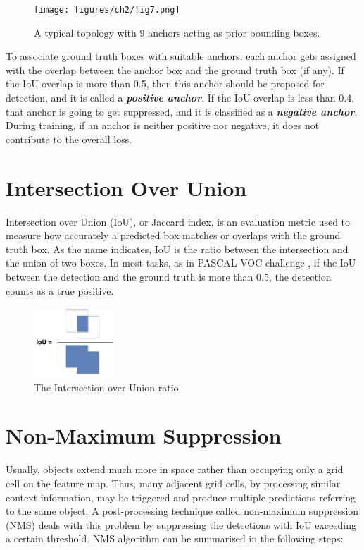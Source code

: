  \begin{figure}[!htb]
  \centering
  \texttt{[image: figures/ch2/fig7.png]}
  \caption{A typical topology with 9 anchors acting as prior bounding boxes.}
  \label{fig7}
\end{figure} 

To associate ground truth boxes with suitable anchors, each anchor gets assigned with the overlap between the anchor box and the ground truth box (if any). If the IoU overlap is more than 0.5, then this anchor should be proposed for detection, and it is called a \textbf{\textit{positive anchor}}. If the IoU overlap is less than 0.4, that anchor is going to get suppressed, and it is classified as a \textbf{\textit{negative anchor}}. During training, if an anchor is neither positive nor negative, it does not contribute to the overall loss.

\section{Intersection Over Union}
Intersection over Union (IoU), or Jaccard index, is an evaluation metric used to measure how accurately a predicted box matches or overlaps with the ground truth box. As the name indicates, IoU is the ratio between the intersection and the union of two boxes. In most tasks, as in PASCAL VOC challenge \cite{everingham2010pascal}, if the IoU between the detection and the ground truth is more than 0.5, the detection counts as a true positive.

\begin{figure}[!htb]
  \centering
  \includegraphics[width=3cm]{figures/ch2/fig8.png}
  \caption{The Intersection over Union ratio.}
  \label{fig8}
\end{figure} 

\section{Non-Maximum Suppression}
Usually, objects extend much more in space rather than occupying only a grid cell on the feature map. Thus, many adjacent grid cells, by processing similar context information, may be triggered and produce multiple predictions referring to the same object. A post-processing technique called non-maximum suppression (NMS) deals with this problem by suppressing the detections with IoU exceeding a certain threshold. NMS algorithm can be summarised in the following steps:

